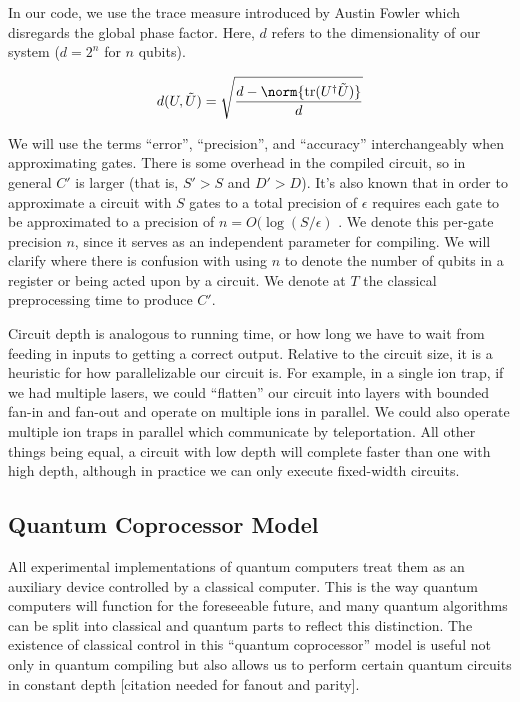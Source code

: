 In our code, we use the trace measure introduced by Austin Fowler which disregards
the global phase factor. Here,
$d$ refers to the dimensionality
of our system ($d = 2^n$ for $n$ qubits).

\begin{equation}
d(U,\tilde{U}) = \sqrt{\frac{d - \norm{\mathrm{tr}(U^\dagger \tilde{U})}}{d}}
\end{equation}

We will use the terms ``error'', ``precision'', and
``accuracy'' interchangeably when approximating gates.
There is some overhead in the compiled circuit, so in
general $C'$ is larger (that is, $S' > S$ and $D' > D$). It's also known that
in order to approximate a circuit with $S$ gates to a total precision of
$\epsilon$
requires each gate to be approximated to a precision of
$n = O(\log(S/\epsilon)$ \cite{Lloyd1995}. We denote this per-gate precision
$n$, since it serves as an independent parameter for compiling. We will clarify
where there is confusion with using $n$ to denote the number of qubits in a
register or being acted upon by a circuit.
We denote at $T$ the classical preprocessing time to
produce $C'$.
 
Circuit depth is analogous to running time, or how long we have to wait from
feeding in inputs to getting a correct output. Relative to the circuit size,
it is a heuristic for how parallelizable our
circuit is. For example, in a single ion trap, if we had multiple lasers,
we could ``flatten'' our circuit into layers with bounded fan-in and
fan-out and operate on multiple ions in parallel.
We could also operate multiple ion traps in parallel which communicate by
teleportation.
All other things being equal, a circuit with low depth will complete
faster than one with high depth, although in practice we can only execute
fixed-width circuits.

\subsection{Quantum Coprocessor Model}

All experimental implementations of quantum computers treat them as an
auxiliary device controlled by a classical computer. This is the way
quantum computers will function for the foreseeable future, and many
quantum algorithms can be split into classical and quantum parts
to reflect this distinction. The existence of classical control in this
``quantum coprocessor'' model is useful not only in quantum compiling but
also allows us to perform certain quantum circuits in constant depth
[citation needed for fanout and parity].

